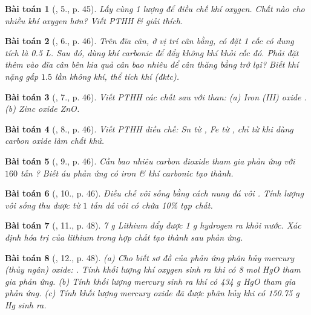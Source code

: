 \documentclass{article}
\newtheorem{baitoan}{Bài toán}
\begin{document}
\begin{baitoan}[\cite{An_Hoa_Hoc_nang_cao_8_9}, 5., p. 45]
	Lấy cùng 1 lượng {\rm{}} để điều chế khí oxygen. Chất nào cho nhiều khí oxygen hơn? Viết {\rm PTHH} \& giải thích.
\end{baitoan}

\begin{baitoan}[\cite{An_Hoa_Hoc_nang_cao_8_9}, 6., p. 46]
	Trên đĩa cân, ở vị trí cân bằng, có đặt 1 cốc có dung tích là {\rm0.5 L}. Sau đó, dùng khí carbonic {\rm{}} để đẩy không khí khỏi cốc đó. Phải đặt thêm vào đĩa cân bên kia quả cân bao nhiêu để cân thăng bằng trở lại? Biết khí {\rm{}} nặng gấp $1.5$ lần không khí, thể tích khí {\rm{}} (đktc).
\end{baitoan}

\begin{baitoan}[\cite{An_Hoa_Hoc_nang_cao_8_9}, 7., p. 46]
	Viết {\rm PTHH} các chất sau với than: (a) Iron (III) oxide {\rm{}}. (b) Zinc oxide {\rm ZnO}.
\end{baitoan}

\begin{baitoan}[\cite{An_Hoa_Hoc_nang_cao_8_9}, 8., p. 46]
	Viết {\rm PTHH} điều chế: {\rm Sn} từ {\rm{}, Fe} từ {\rm{}}, chỉ từ {\rm{}} khi dùng carbon oxide làm chất khử.
\end{baitoan}

\begin{baitoan}[\cite{An_Hoa_Hoc_nang_cao_8_9}, 9., p. 46]
	Cần bao nhiêu carbon dioxide tham gia phản ứng với $160$ tấn {\rm{}}? Biết áu phản ứng có iron \& khí carbonic tạo thành.
\end{baitoan}

\begin{baitoan}[\cite{An_Hoa_Hoc_nang_cao_8_9}, 10., p. 46]
	Điều chế vôi sống bằng cách nung đá vôi {\rm{}}. Tính lượng vôi sống thu được từ $1$ tấn đá vôi có chứa {\rm10\%} tạp chất.
\end{baitoan}

\begin{baitoan}[\cite{An_Hoa_Hoc_nang_cao_8_9}, 11., p. 48]
	{\rm7 g} Lithium đẩy được {\rm1 g} hydrogen ra khỏi nước. Xác định hóa trị của lithium trong hợp chất tạo thành sau phản ứng.
\end{baitoan}

\begin{baitoan}[\cite{An_Hoa_Hoc_nang_cao_8_9}, 12., p. 48]
	(a) Cho biết sơ đồ của phản ứng phân hủy mercury (thủy ngân) oxide: {\rm{}}. Tính khối lượng khí oxygen sinh ra khi có {\rm8 mol HgO} tham gia phản ứng. (b) Tính khối lượng mercury sinh ra khí có {\rm434 g HgO} tham gia phản ứng. (c) Tính khối lượng mercury oxide đã được phân hủy khi có {\rm150.75 g Hg} sinh ra.
\end{baitoan}
\end{document}
